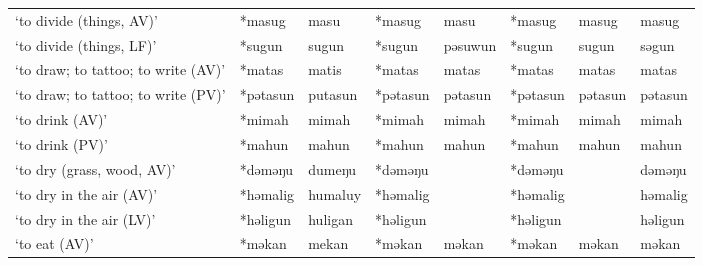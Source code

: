 \begin{landscape}
\begin{longtable}[c]{@{}p{3cm}<{\raggedright}p{2.75cm}<{\raggedright}p{2.75cm}<{\raggedright}p{2.75cm}<{\raggedright}p{2.75cm}<{\raggedright}p{2.75cm}<{\raggedright}p{2.75cm}<{\raggedright}p{2.75cm}<{\raggedright}@{}}
`to divide (things, AV)'                             & *masug             & masu                           & *masug             & masu                       & *masug           & masug                    & masug                             \\
`to divide (things, LF)'                             & *sugun             & sugun                          & *sugun             & pəsuwun                    & *sugun           & sugun                    & səgun                             \\
`to draw; to tattoo; to write (AV)'                  & *matas             & matis                          & *matas             & matas                      & *matas           & matas                    & matas                             \\
`to draw; to tattoo; to write (PV)'                  & *pətasun           & putasun                        & *pətasun           & pətasun                    & *pətasun         & pətasun                  & pətasun                           \\
`to drink (AV)'                                      & *mimah             & mimah                          & *mimah             & mimah                      & *mimah           & mimah                    & mimah                             \\
`to drink (PV)'                                      & *mahun             & mahun                          & *mahun             & mahun                      & *mahun           & mahun                    & mahun                             \\
`to dry (grass, wood, AV)'                           & *dəməŋu            & dumeŋu                         & *dəməŋu            &                            & *dəməŋu          &                          & dəməŋu                            \\
`to dry in the air (AV)'                             & *həmalig           & humaluy                        & *həmalig           &                            & *həmalig         &                          & həmalig                           \\
`to dry in the air (LV)'                             & *həligun           & huligan                        & *həligun           &                            & *həligun         &                          & həligun                           \\
`to eat (AV)'                                        & *məkan             & mekan                          & *məkan             & məkan                      & *məkan           & məkan                    & məkan                             \\

\end{longtable}
\end{landscape}
